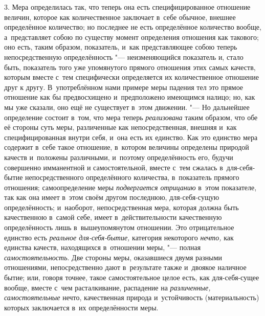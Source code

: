 3. Мера определилась так, что теперь она есть специфицированное отношение
величин, которое как количественное заключает в~себе обычное, внешнее
определённое количество; но последнее не есть определённое количество вообще,
а~представляет собою по существу момент определения отношения как такового;
оно есть, таким образом, показатель, и~как представляющее собою теперь
непосредственную определённость "--- неизменяющийся показатель и, стало быть,
показатель того уже упомянутого прямого отношения этих самых качеств, которым
вместе с~тем специфически определяется их количественное отношение друг к
другу. В~употреблённом нами примере меры падения тел это прямое отношение как
бы предвосхищено и~предположено имеющимся налицо; но, как мы уже сказали, оно
ещё не существует в~этом движении. "--- Но дальнейшее определение состоит
в~том, что мера теперь {\em реализована} таким образом, что обе её стороны суть
меры, различенные как непосредственная, внешняя и~как специфицированная внутри
себя, и~она есть их единство. Как это единство мера содержит в~себе такое
отношение, в~котором величины определены природой качеств и~положены
различными, и~поэтому определённость его, будучи совершенно имманентной и
самостоятельной, вместе с~тем сжалась в~для-себя-бытие непосредственного
определённого количества, в~показатель прямого отношения; самоопределение меры
{\em подвергается отрицанию} в~этом показателе, так как она имеет в~этом своём
другом последнюю, для-себя-сущую определённость; и~наоборот, непосредственная
мера, которая должна быть качественною в~самой себе, имеет в~действительности
качественную определённость лишь в~вышеупомянутом отношении. Это отрицательное
единство есть {\em реальное для-себя-бытие,} категория некоторого {\em нечто,}
как единства качеств, находящихся в~отношении меры, "--- полная
{\em самостоятельность}. Две стороны меры, оказавшиеся двумя разными
отношениями, непосредственно дают в~результате также и~двоякое наличное бытие;
или, говоря точнее, такое самостоятельное целое есть, как для-себя-сущее
вообще, вместе с~чем расталкивание, распадение на {\em различенные,}
{\em самостоятельные} нечто, качественная природа и~устойчивость
(материальность) которых заключается в~их определённости меры.
